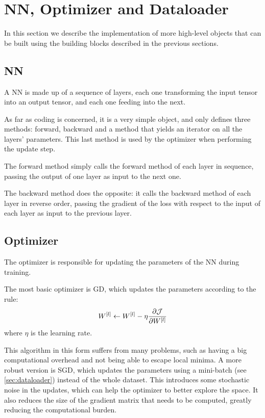 \section{\acl*{NN}, Optimizer and Dataloader}
In this section we describe the implementation of more high-level objects that can be built using the building blocks described in the previous sections.

\subsection{\acl*{NN}}
A \acl{NN} is made up of a sequence of layers, each one transforming the input tensor into an output tensor, and each one feeding into the next.

As far as coding is concerned, it is a very simple object, and only defines three methods: forward, backward and a method that yields an iterator on all the layers' parameters. This last method is used by the optimizer when performing the update step.

The forward method simply calls the forward method of each layer in sequence, passing the output of one layer as input to the next one.

The backward method does the opposite: it calls the backward method of each layer in reverse order, passing the gradient of the loss with respect to the input of each layer as input to the previous layer.

\subsection{Optimizer}
The optimizer is responsible for updating the parameters of the \acl{NN} during training.

The most basic optimizer is \ac{GD}, which updates the parameters according to the rule:
\begin{equation}
    W^{[l]} \gets W^{[l]} - \eta \pdv{\mathcal{J}}{W^{[l]}}
\end{equation}
where $\eta$ is the learning rate.

This algorithm in this form suffers from many problems, such as having a big computational overhead and not being able to escape local minima. A more robust version is \ac{SGD}, which updates the parameters using a mini-batch (see \cref{sec:dataloader}) instead of the whole dataset. This introduces some stochastic noise in the updates, which can help the optimizer to better explore the space. It also reduces the size of the gradient matrix that needs to be computed, greatly reducing the computational burden.

